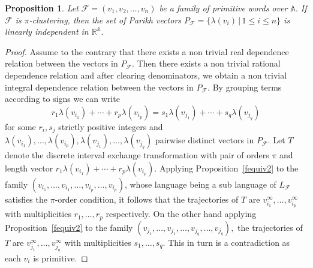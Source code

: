 \documentclass[12pt,a4paper]{amsart}
\newcommand{\reals}{{\mathbb R}}
\newcommand{\A}{{\mathbb A}}
\newtheorem{proposition}{Proposition}
\newtheorem{remark}{Remark}
\begin{document}
\begin{proposition}\label{li} Let $\mathcal F=(v_1,v_2,\ldots ,v_n)$ be a family of  primitive words over $\A.$ If $\mathcal F$ is $\pi$-clustering, then  the set of Parikh vectors  $P_{\mathcal F}= \{\lambda (v_i)\,|\,1\leq i\leq n\}$ is linearly independent in $\reals ^\A.$ \end{proposition}

\begin{proof} Assume to the contrary that there exists a non trivial real dependence relation between the vectors in $P_{\mathcal F}.$ Then there exists a non trivial rational dependence relation and after clearing denominators, we obtain a non trivial integral dependence relation between the vectors in $P_{\mathcal F}.$ By grouping  terms according to signs we can write 
\begin{equation}\label{dep}r_1\lambda (v_{i_1}) +\cdots + r_p\lambda (v_{i_p})=s_1\lambda (v_{j_1}) +\cdots + s_q\lambda (v_{j_q})\end{equation} for some  $r_i,s_j$ strictly positive integers and $\lambda (v_{i_1}), \ldots ,\lambda (v_{i_p}), \lambda (v_{j_1}) ,\ldots , \lambda (v_{j_q})$ pairwise distinct vectors in $P_{\mathcal F}.$  Let $T$ denote the discrete interval exchange transformation with pair of orders $\pi$ and  length vector $r_1\lambda (v_{i_1}) +\cdots + r_p\lambda (v_{i_p}).$ Applying Proposition~\ref{fequiv2}  to the family $(v_{i_1},\ldots , v_{i_1}, \ldots , v_{i_p}, \ldots , v_{i_p})$, whose language being a sub language of $L_{\mathcal F}$ satisfies the $\pi$-order condition,  it follows  that the trajectories of $T$ are $v_{i_1}^\infty , \ldots , v_{i_p}^\infty$ with multiplicities $r_1,\ldots ,r_p$ respectively. On the other hand applying Proposition~\ref{fequiv2} to the  family $(v_{j_1},\ldots , v_{j_1}, \ldots , v_{j_q}, \ldots , v_{j_q}),$ 
the trajectories of $T$ are $v_{j_1}^\infty, \ldots , v_{j_q}^\infty$ with multiplicities $s_1,\ldots ,s_q.$ This in turn is a contradiction as each  $v_i$ is primitive. \end{proof}

 
\end{document}
